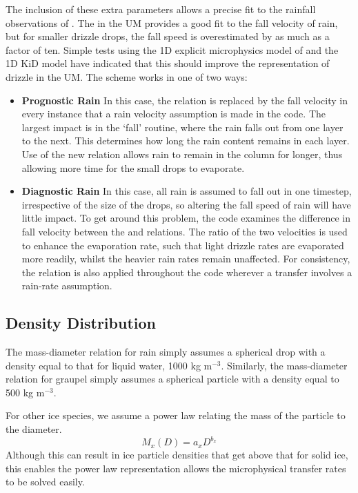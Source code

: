 \documentclass{UMDP_article}
\def\bq{\begin{equation}}
\def\eq{\end{equation}}
\begin{document}
The inclusion of these extra parameters allows a precise fit to the rainfall
observations of \cite{Beard:1976}. The \cite{Sachidananda:Zrnic:1986} 
in the UM provides a good fit to the fall velocity of rain, but for smaller 
drizzle drops, the fall speed is overestimated by as much as a factor of ten.
Simple tests using the 1D explicit microphysics model of 
\cite{Wilkinson:etal:2010:qj} 
and the 1D KiD model \citep{Shipway:Hill:2011}
have indicated that this should improve the representation of drizzle in the UM. 
The scheme works in one of two ways:
\begin{itemize}
\item \textbf{Prognostic Rain} In this case, the \cite{Sachidananda:Zrnic:1986}
relation is replaced by the \cite{Abel:Shipway:2007} fall velocity in every 
instance that a rain velocity assumption is made in the code. The largest impact
is in the `fall' routine, where the rain falls out from one layer to the next.
This determines how long the rain content remains in each layer. Use of the new
\cite{Abel:Shipway:2007} relation allows rain to remain in the column for longer, 
thus allowing more time for the small drops to evaporate.
\item \textbf{Diagnostic Rain} In this case, all rain is assumed to fall out in 
one timestep, irrespective of the size of the drops, so altering the fall speed
of rain will have little impact. To get around this problem, the code examines 
the difference in fall velocity between the \cite{Sachidananda:Zrnic:1986} and 
\cite{Abel:Shipway:2007} relations. The ratio of the two velocities is used to
enhance the evaporation rate, such that light drizzle rates are evaporated more 
readily, whilst the heavier rain rates remain unaffected. For consistency, the
\cite{Abel:Shipway:2007} relation is also applied throughout the code wherever
a transfer involves a rain-rate assumption. 
\end{itemize}

\subsection{Density Distribution}
\label{sec:density}

The mass-diameter relation for rain simply assumes a spherical drop
with a density equal to that for liquid water, 1000 kg m$^{-3}$. Similarly,
the mass-diameter relation for graupel simply assumes a spherical particle with 
a density equal to 500 kg m$^{-3}$.

For other ice species, we assume a power law relating the mass of the 
particle to the diameter.
\bq
\label{eq:m_x}
M_x(D)=a_x D^{b_x}
\eq
Although this can result in ice particle densities that get above that
for solid ice, this enables the power law representation allows the
microphysical transfer rates to be solved easily.
\end{document}
